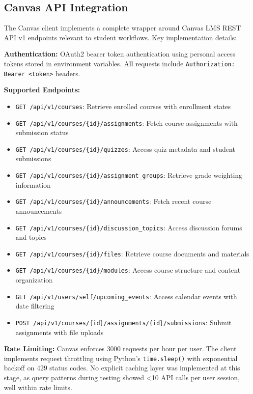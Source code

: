 \documentclass{article}
\begin{document}
\subsection{Canvas API Integration}

The Canvas client implements a complete wrapper around Canvas LMS REST API v1 endpoints relevant to student workflows. Key implementation details:

\textbf{Authentication:} OAuth2 bearer token authentication using personal access tokens stored in environment variables. All requests include \texttt{Authorization: Bearer <token>} headers.

\textbf{Supported Endpoints:}
\begin{itemize}
    \item \texttt{GET /api/v1/courses}: Retrieve enrolled courses with enrollment states
    \item \texttt{GET /api/v1/courses/\{id\}/assignments}: Fetch course assignments with submission status
    \item \texttt{GET /api/v1/courses/\{id\}/quizzes}: Access quiz metadata and student submissions
    \item \texttt{GET /api/v1/courses/\{id\}/assignment\_groups}: Retrieve grade weighting information
    \item \texttt{GET /api/v1/courses/\{id\}/announcements}: Fetch recent course announcements
    \item \texttt{GET /api/v1/courses/\{id\}/discussion\_topics}: Access discussion forums and topics
    \item \texttt{GET /api/v1/courses/\{id\}/files}: Retrieve course documents and materials
    \item \texttt{GET /api/v1/courses/\{id\}/modules}: Access course structure and content organization
    \item \texttt{GET /api/v1/users/self/upcoming\_events}: Access calendar events with date filtering
    \item \texttt{POST /api/v1/courses/\{id\}/assignments/\{id\}/submissions}: Submit assignments with file uploads
\end{itemize}

\textbf{Rate Limiting:} Canvas enforces 3000 requests per hour per user. The client implements request throttling using Python's \texttt{time.sleep()} with exponential backoff on 429 status codes. No explicit caching layer was implemented at this stage, as query patterns during testing showed <10 API calls per user session, well within rate limits.
\end{document}
